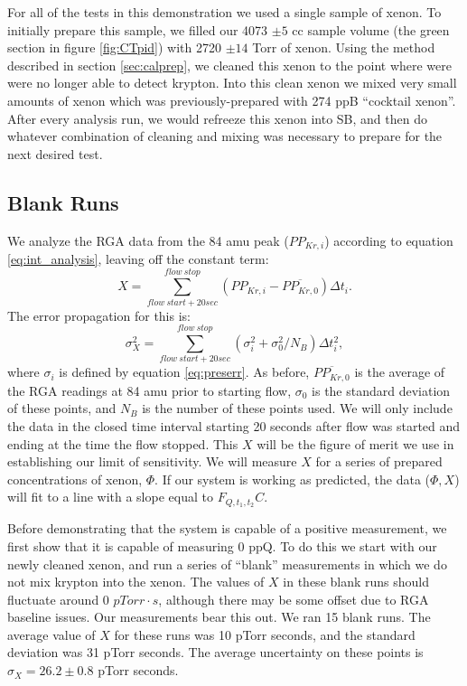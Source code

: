 For all of the tests in this demonstration we used a single sample of xenon. To initially prepare this sample, we filled our 4073 $\pm 5$ cc sample volume (the green section in figure \ref{fig:CTpid}) with 2720 $\pm 14$ Torr of xenon. Using the method described in section \ref{sec:calprep}, we cleaned this xenon to the point where were were no longer able to detect krypton. Into this clean xenon we mixed very small amounts of xenon which was previously-prepared with 274 ppB ``cocktail xenon''. After every analysis run, we would refreeze this xenon into SB, and then do whatever combination of cleaning and mixing was necessary to prepare for the next desired test.

\subsection{Blank Runs}\label{sec:blankruns}
We analyze the RGA data from the 84 amu peak ($PP_{Kr,i}$) according to equation \ref{eq:int_analysis}, leaving off the constant term:
\begin{equation}
\label{eq:SLACintan}
X=\sum_{flow \  start+20sec}^{flow \ stop}(PP_{Kr,i}-\overline{PP_{Kr,0}})\Delta t_i.
\end{equation}
The error propagation for this is:
\begin{equation}
\sigma_{X}^2=\sum_{flow \  start+20sec}^{flow \ stop}(\sigma_i^2+\sigma_0^2/N_B)\Delta t_i^2,
\end{equation}
where $\sigma_i$ is defined by equation \ref{eq:preserr}. As before, $\overline{PP_{Kr,0}}$ is the average of the RGA readings at 84 amu prior to starting flow, $\sigma_0$ is the standard deviation of these points, and $N_B$ is the number of these points used. We will only include the data in the closed time interval starting 20 seconds after flow was started and ending at the time the flow stopped. This $X$ will be the figure of merit we use in establishing our limit of sensitivity. We will measure $X$ for a series of prepared concentrations of xenon, $\Phi$. If our system is working as predicted, the data ($\Phi,X$) will fit to a line with a slope equal to $F_{Q,t_1,t_2}C$.

Before demonstrating that the system is capable of a positive measurement, we first show that it is capable of measuring 0 ppQ. To do this we start with our newly cleaned xenon, and run a series of ``blank'' measurements in which we do not mix krypton into the xenon. The values of $X$ in these blank runs should fluctuate around 0 $pTorr\cdot s$, although there may be some offset due to RGA baseline issues. Our measurements bear this out. We ran 15 blank runs. The average value of $X$ for these runs was 10 pTorr seconds, and the standard deviation was 31 pTorr seconds. The average uncertainty on these points is $\sigma_X=26.2\pm0.8$ pTorr seconds.

